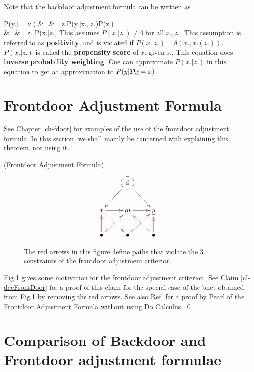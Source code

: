 Note that the backdoor adjustment  formula
can be written as

\beqa
P(y.|\cald \rvx. =x.)
&=&
\sum_{z.}P(y.|x., z.)P(z.)
\\
&=&
\sum_{z.}
{P(x.|z.)}
\eeqa
This assumes $P(x.|z.)\neq 0$
for all $x., z.$. This assumption
is referred to
as {\bf positivity},
and is violated
if $P(x.|z.)=\delta(x., x.(z.))$.
$P(x.|z.)$ is called the
{\bf propensity score}
of $x.$ given $z.$.
This
equation does
{\bf inverse probability weighting}.
One
can approximate $P(x.|z.)$
in this equation
to get
an approximation
to  $P(y|\cald\rvx=x)$.


\section{Frontdoor Adjustment Formula}
See Chapter \ref{ch-fdoor}
for examples of the use of the
frontdoor adjustment formula.
In this section,
we shall mainly be
concerned with
explaining this
theorem, not using it.

\fdoordef


\begin{claim} (Frontdoor Adjustment
Formula)

\fdoorclaim

\end{claim}
\proof
\begin{figure}[h!]
$$
\xymatrix{
&*++[F-o]{\rvc}\ar[ld]\ar[rd]
\\
\rvx\ar[r]\ar@[red][dr]
&\rvm\ar[r]
&\rvy
\\
\bullet\ar@[red][u]\ar@[red][ur]
&\bullet\ar@[red][ur]
&\bullet\ar@[red][u]\ar@[red][ul]
}
$$
\caption{The red arrows in this figure define paths 
that violate the 3 constraints of the frontdoor adjustment criterion.}
 \label{fig-fdoor-red-paths}
\end{figure}

Fig.\ref{fig-fdoor-red-paths}
gives some motivation for the frontdoor adjustment criterion.
See Claim \ref{cl-decFrontDoor}
for a proof of this claim
for the
special case of the bnet obtained from 
Fig.\ref{fig-fdoor-red-paths}
by removing  the red arrows.
See also Ref.\cite{pearl-frontdoor}
for a proof by Pearl
of the Frontdoor Adjustment Formula
without
using Do Calculus.
\qed

\section{Comparison
of Backdoor and Frontdoor
adjustment formulae}


